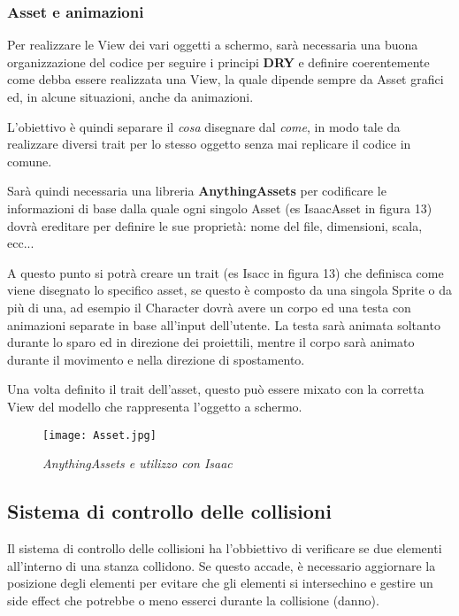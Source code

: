 \subsubsection{Asset e animazioni}

Per realizzare le View dei vari oggetti a schermo, sarà necessaria una buona organizzazione del codice 
per seguire i principi \textbf{DRY} e definire coerentemente come debba essere realizzata una View, 
la quale dipende sempre da Asset grafici ed, in alcune situazioni, anche da animazioni. 

L'obiettivo è quindi separare il \textit{cosa} disegnare dal \textit{come}, 
in modo tale da realizzare diversi trait per lo stesso oggetto senza mai replicare il codice in comune.

Sarà quindi necessaria una libreria \textbf{AnythingAssets} per codificare le informazioni di base 
dalla quale ogni singolo Asset (es IsaacAsset in figura 13) dovrà ereditare per definire le sue proprietà: 
nome del file, dimensioni, scala, ecc...

A questo punto si potrà creare un trait (es Isacc in figura 13) che definisca come viene disegnato lo specifico asset, 
se questo è composto da una singola Sprite o da più di una, 
ad esempio il Character dovrà avere un corpo ed una testa con animazioni separate in base all'input dell'utente. 
La testa sarà animata soltanto durante lo sparo ed in direzione dei proiettili, 
mentre il corpo sarà animato durante il movimento e nella direzione di spostamento.

Una volta definito il trait dell'asset, questo può essere mixato con la corretta View del modello che rappresenta l'oggetto a schermo.


\begin{figure}[!hbt]
    \centering
    \texttt{[image: Asset.jpg]}
    \caption{\textit{AnythingAssets e utilizzo con Isaac}} 
\end{figure}


\subsection{Sistema di controllo delle collisioni}
Il sistema di controllo delle collisioni ha l'obbiettivo di verificare se due elementi all'interno di una stanza collidono. 
Se questo accade, è necessario aggiornare la posizione degli elementi per evitare che gli elementi si intersechino e gestire un side effect che potrebbe o meno esserci durante la collisione (danno). 

